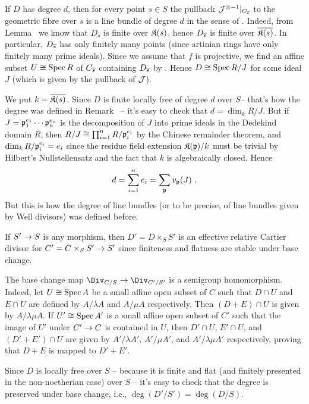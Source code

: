 \documentclass[a4paper,parskip=half,numbers=enddot, DIV=12]{scrreprt}
\begin{document}
\begin{rem}
	If $D$ has degree $d$, then for every point $s\in S$ the pullback $\mathcal{J}^{\otimes -1}|_{C_{\overline{s}}}$ to the geometric fibre over $s$ is a line bundle of degree $d$ in the sense of \cite[Theorem~7]{alggeo2}. Indeed, from Lemma~ we know that $D_s$ is finite over $\mathfrak{K}(s)$, hence $D_{\overline{s}}$ is finite over $\overline{\mathfrak{K}(s)}$. In particular, $D_{\overline{s}}$ has only finitely many points (since artinian rings have only finitely many prime ideals). Since we assume that $f$ is projective, we find an affine subset $U\cong \operatorname{Spec} R$ of $C_{\overline{s}}$ containing $D_{\overline{s}}$ by \cite[Proposition~2.2.1]{alggeo2}. Hence $D\cong \operatorname{Spec} R/J$ for some ideal $J$ (which is given by the pullback of $\mathcal{J}$).
	
	 We put $k=\overline{\mathfrak{K}(s)}$. Since $D$ is finite locally free of degree $d$ over $S$-- that's how the degree was defined in Remark~ -- it's easy to check that $d=\dim_k R/J$. But if $J=\mathfrak{p}_1^{e_1}\cdots\mathfrak{p}_n^{e_n}$ is the decomposition of $J$ into prime ideals in the Dedekind domain $R$, then $R/J\cong \prod_{i=1}^nR/\mathfrak{p}_i^{e_i}$ by the Chinese remainder theorem, and $\dim_k R/\mathfrak{p}_i^{e_i}=e_i$ since the residue field extension $\mathfrak{K}(\mathfrak{p})/k$ must be trivial by Hilbert's Nullstellensatz and the fact that $k$ is algebraically closed. Hence
	 \begin{align*}
	 	d=\sum_{i=1}^ne_i=\sum_{\mathfrak{p}} v_{\mathfrak{p}}(J)\;.
	 \end{align*}
	 But this is how the degree of line bundles (or to be precise, of line bundles given by Weil divisors) was defined before.
\end{rem}
\begin{rem}
	\begin{alphanumerate}
		\item {}If $S'\morphism S$ is any morphism, then $D'=D\times_SS'$ is an effective relative Cartier divisor for $C'=C\times_SS'\morphism S'$ since finiteness and flatness are stable under base change.
		\item The base change map $\Div_{C/S}\morphism\Div_{C'/S'}$ is a semigroup homomorphism. Indeed, let $U\cong \operatorname{Spec} A$ be a small affine open subset of $C$ such that $D\cap U$ and $E\cap U$ are defined by $A/\lambda A$ and $A/\mu A$ respectively. Then $(D+E)\cap U$ is given by $A/\lambda\mu A$. If $U'\cong \operatorname{Spec} A'$ is a small affine open subset of $C'$ such that the image of $U'$ under $C'\morphism C$ is contained in $U$, then $D'\cap U$, $E'\cap U$, and $(D'+E')\cap U$ are given by $A'/\lambda A'$, $A'/\mu A'$, and $A'/\lambda\mu A'$ respectively, proving that $D+E$ is mapped to $D'+E'$.
		\item Since $D$ is locally free over $S$ -- because it is finite and flat (and finitely presented in the non-noetherian case) over $S$ -- it's easy to check that the degree is preserved under base change, i.e., $\deg(D'/S')=\deg(D/S)$.
	\end{alphanumerate}
	\end{rem}
\end{document}
